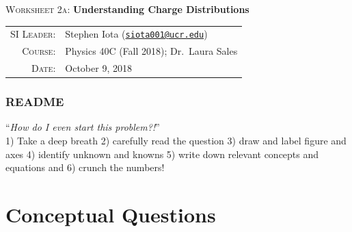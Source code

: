 \documentclass{article}
\newcommand{\email}[1]{\texttt{\href{mailto:#1}{#1}}}
\begin{document}
\begin{center}

\Large{\textsc{Worksheet 2a}: \textbf{Understanding Charge Distributions}}

\end{center}

\vspace{.5mm}


\begin{tabular}{rl}
\textsc{SI Leader}:
&
Stephen Iota (\email{siota001@ucr.edu})
\\
\textsc{Course}:
&
Physics 40C (Fall 2018); Dr.~Laura Sales
\\
\textsc{Date}:
&
October 9, 2018
\end{tabular}


\subsubsection*{README}

``\textit{How do I even start this problem?!}''\\
1) Take a deep breath
2) carefully read the question
3) draw and label figure and axes
4) identify unknown and knowns
5) write down relevant concepts and equations and 
6) crunch the numbers!


\section{Conceptual Questions}
\end{document}

